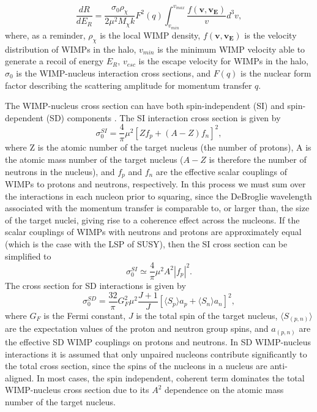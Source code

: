 \documentclass[a4paper,12pt]{article}
\begin{document}
\begin{equation} \label{final_dRdER_2}
\frac{dR}{dE_R}=\frac{\sigma_0 \rho_\chi}{2 \mu^2 M_\chi k} F^2(q)  \int_{v_{min}}^{v_{max}} \frac{f(\mathbf{v},\mathbf{v_E})}{v} d^3v, 
\end{equation}
where, as a reminder, $\rho_\chi$ is the local WIMP density, $f(\mathbf{v},\mathbf{v_E})$ is the velocity distribution of WIMPs in the halo, $v_{min}$ is the minimum WIMP velocity able to generate a recoil of energy $E_R$, $v_{esc}$ is the escape velocity for WIMPs in the halo, $\sigma_0$ is the WIMP-nucleus interaction cross sections, and $F(q)$ is the nuclear form factor describing the scattering amplitude for momentum transfer $q$.

The WIMP-nucleus cross section can have both spin-independent (SI) and spin-dependent (SD) components \cite{Shan}. The SI interaction cross section is given by
\[\sigma_0^{SI}=\frac{4}{\pi}\mu^2 \left[Z f_p + (A - Z) f_n \right]^2,\]
where Z is the atomic number of the target nucleus (the number of protons), A is the atomic mass number of the target nucleus ($A-Z$ is therefore the number of neutrons in the nucleus), and $f_p$ and $f_n$ are the effective scalar couplings of WIMPs to protons and neutrons, respectively.  In this process we must sum over the interactions in each nucleon prior to squaring, since the DeBroglie wavelength associated with the momentum transfer is comparable to, or larger than, the size of the target nuclei, giving rise to a coherence effect across the nucleons.  If the scalar couplings of WIMPs with neutrons and protons are approximately equal (which is the case with the LSP of SUSY), then the SI cross section can be simplified to
\[\sigma_0^{SI} \simeq \frac{4}{\pi}\mu^2 A^2 |f_p|^2. \]
The cross section for SD interactions is given by
\[\sigma_0^{SD}=\frac{32}{\pi}G_F^2\mu^2\frac{J+1}{J} \left[\langle S_p \rangle a_p + \langle S_n \rangle a_n \right]^2, \]
where $G_F$ is the Fermi constant, $J$ is the total spin of the target nucleus, $\langle S_{(p,n)} \rangle$ are the expectation values of the proton and neutron group spins, and $a_{(p,n)}$ are the effective SD WIMP couplings on protons and neutrons.  In SD WIMP-nucleus interactions it is assumed that only unpaired nucleons contribute significantly to the total cross section, since the spins of the nucleons in a nucleus are anti-aligned.  In most cases, the spin independent, coherent term dominates the total WIMP-nucleus cross section due to its $A^2$ dependence on the atomic mass number of the target nucleus.  
\end{document}
